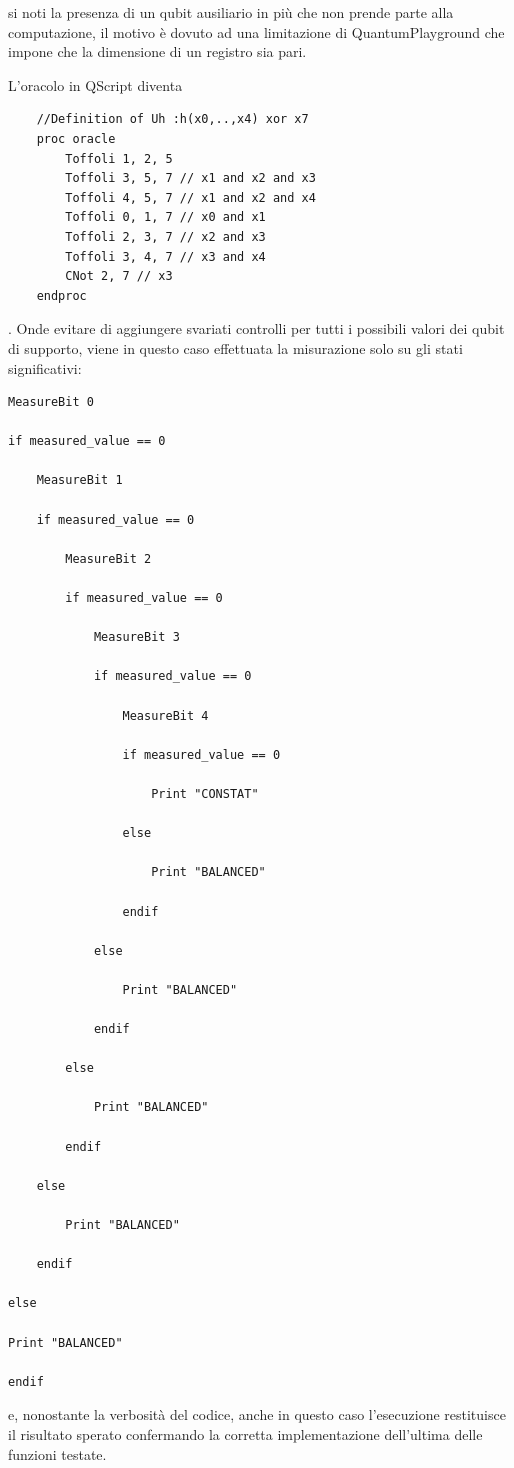 \documentclass[12pt,a4paper,openright]{report}
\begin{document}
si noti la presenza di un qubit ausiliario in più che non prende parte alla computazione, il motivo è dovuto ad una limitazione
di QuantumPlayground che impone che la dimensione di un registro sia pari.\par
L'oracolo in QScript diventa

\begin{lstlisting}
    //Definition of Uh :h(x0,..,x4) xor x7
    proc oracle
        Toffoli 1, 2, 5
        Toffoli 3, 5, 7 // x1 and x2 and x3
        Toffoli 4, 5, 7 // x1 and x2 and x4 
        Toffoli 0, 1, 7 // x0 and x1
        Toffoli 2, 3, 7 // x2 and x3
        Toffoli 3, 4, 7 // x3 and x4
        CNot 2, 7 // x3
    endproc
\end{lstlisting}

.  Onde evitare di aggiungere svariati controlli per tutti i possibili valori dei qubit di supporto, viene in questo caso effettuata
la misurazione solo su gli stati significativi:

\begin{lstlisting}
MeasureBit 0

if measured_value == 0 

	MeasureBit 1

	if measured_value == 0 

		MeasureBit 2

		if measured_value == 0

			MeasureBit 3

			if measured_value == 0 

				MeasureBit 4

				if measured_value == 0 

					Print "CONSTAT"

				else

					Print "BALANCED"

				endif

			else

				Print "BALANCED"

			endif

		else

			Print "BALANCED"

		endif

	else

		Print "BALANCED"

	endif

else

Print "BALANCED"

endif
\end{lstlisting}
e, nonostante la verbosità del codice, anche in questo caso l'esecuzione restituisce il risultato sperato confermando la corretta
implementazione dell'ultima delle funzioni testate.
\end{document}
